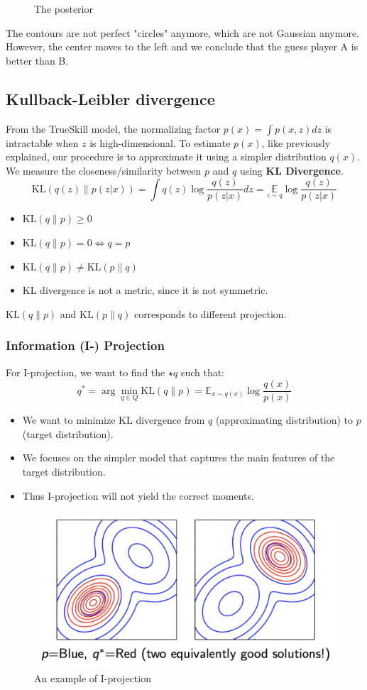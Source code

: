 \begin{example}
\begin{figure}[H]
        \caption{The posterior}
        \label{fig:posterior_trueskill}
    \end{figure}
    The contours are not perfect "circles" anymore, which are not Gaussian anymore. However, the center moves to the left and we conclude that the guess player A is better than B.
\end{example}
\subsection{Kullback-Leibler divergence}
From the TrueSkill model, the normalizing factor $p(x)=\int p(x,z)dz$ is intractable when $z$ is high-dimensional. To estimate $p(x)$, like previously explained, our procedure is to approximate it using a simpler distribution $q(x)$. We measure the closeness/similarity between $p$ and $q$ using \textbf{KL Divergence}.
$$\mathrm{KL}(q(z) \| p(z | x))=\int q(z) \log \frac{q(z)}{p(z | x)} d z=\underset{z \sim q}{\mathbb{E}} \log \frac{q(z)}{p(z | x)}$$
\begin{itemize}
    \item $\mathrm{KL}(q \| p) \geq 0$
    \item $\mathrm{KL}(q \| p)=0 \Leftrightarrow q=p$
    \item $\mathrm{KL}(q \| p) \neq \mathrm{KL}(p \| q)$
    \item KL divergence is not a metric, since it is not symmetric.
\end{itemize}
$\mathrm{KL}(q \| p)$ and $\mathrm{KL}(p \| q)$ corresponds to different projection.

\subsubsection*{Information (I-) Projection}
For I-projection, we want to find the $\star{q}$ such that:
$$q^*=\arg \min _{q \in Q} \mathrm{KL}(q \| p)=\mathbb{E}_{x \sim q(x)} \log \frac{q(x)}{p(x)}$$
\begin{itemize}
    \item We want to minimize KL divergence from $q$ (approximating distribution) to $p$ (target distribution).
    \item We focuses on the simpler model that captures the main features of the target distribution.
    \item Thus I-projection will not yield the correct moments.
\end{itemize}
\begin{figure}[H]
    \centering
    \includegraphics[width = .4\linewidth]{codes/figures/section8/figure_8_4.png}
    \caption{An example of I-projection}
    \label{fig:I-projection}
\end{figure}


